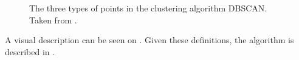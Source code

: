 \begin{figure}
\caption{The three types of points in the clustering algorithm DBSCAN. Taken from \cite[page 528]{pang2006introduction}.}
\label{dbscan_point_types}
\end{figure}

A visual description can be seen on .
Given these definitions, the algorithm is described in .


